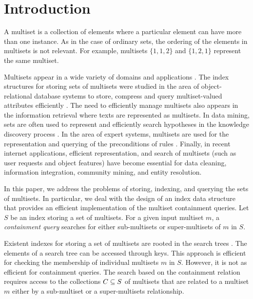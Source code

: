 \section{Introduction} \label{c:introduction}

A multiset is a collection of elements where a particular element can have more than one instance. As in the case of ordinary sets, the ordering of the elements in multisets is not relevant. For example, multisets $\{1,1,2\}$ and $\{1,2,1\}$ represent the same multiset.

Multisets appear in a wide variety of domains and applications \cite{savnik2021plos}. The index structures for storing sets of multisets were studied in the area of object-relational database systems to store, compress and query multiset-valued attributes efficiently \cite{bouros2016set,gripon2012compressing,ross2004symmetric,steinruecken2015compressing}. The need to efficiently manage multisets also appears in the information retrieval \cite{zobel1992efficient,zobel2006inverted,manning2008introduction} where texts are represented as multisets. In data mining, sets are often used to represent and efficiently search hypotheses in the knowledge discovery process \cite{mannila1997,flach1999aicom}. In the area of expert systems, multisets are used for the representation and querying of the preconditions of rules \cite{forgy1982}. Finally, in recent internet applications, efficient representation, and search of multisets (such as user requests and object features) have become essential \cite{bayardo2007simlar,xiao2011tods,wang2017vldb} for data cleaning, information integration, community mining, and entity resolution. 

In this paper, we address the problems of storing, indexing, and querying the sets of multisets. In particular, we deal with the design of an index data structure that provides an efficient implementation of the multiset containment queries. Let $S$ be an index storing a set of multisets. For a given input multiset $m$, a \emph{containment query} searches for either sub-multisets or super-multisets of $m$ in $S$. 

Existent indexes for storing a set of multisets are rooted in the search trees \cite{corman2001}. The elements of a search tree can be accessed through keys. This approach is efficient for checking the membership of individual multisets $m$ in $S$. However, it is not as efficient for  containment queries. The search based on the containment relation requires access to the collections $C\subseteq\/S$ of multisets that are related to a multiset $m$ either by a sub-multiset or a super-multisets relationship. 

